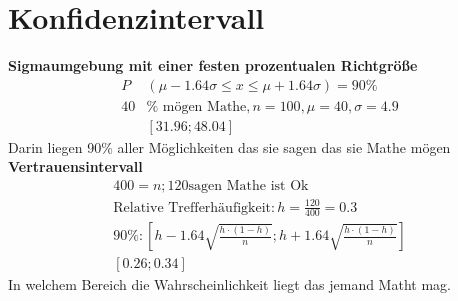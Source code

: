 \section{Konfidenzintervall}
\textbf{Sigmaumgebung mit einer festen prozentualen Richtgröße}
\begin{align*}
    P&(\mu -1.64 \sigma \leq x\leq \mu+1.64\sigma) = 90\%\\
    40&\%\textrm{ mögen Mathe}, n=100, \mu = 40, \sigma = 4.9\\
    &[31.96; 48.04]
\end{align*}
Darin liegen 90\% aller Möglichkeiten das sie sagen das sie Mathe mögen\\
\textbf{Vertrauensintervall}
\begin{align*}
    400 = n; 120 \textrm{sagen Mathe ist Ok}\\
    \textrm{Relative Trefferhäufigkeit}: h= \frac{120}{400} = 0.3\\
    90\%:[h-1.64\sqrt{\frac{h\cdot(1-h)}{n}};h+ 1.64\sqrt{\frac{h\cdot(1-h)}{n}}]\\
    [0.26;0.34]
\end{align*}
In welchem Bereich die Wahrscheinlichkeit liegt das jemand Matht mag.
